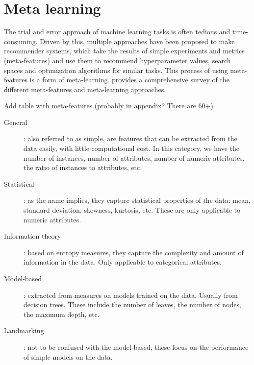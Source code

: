 \section{Meta learning}
\label{sec:meta-learning}

The trial and error approach of machine learning tasks is often tedious and
time-consuming. Driven by this, multiple approaches have been proposed to make
recommender systems, which take the results of simple experiments and metrics
(meta-features) and use them to recommend hyperparameter values, search spaces
and optimization algorithms for similar tasks. This process of using
meta-features is a form of meta-learning. \Textcite{rivolliMetafeaturesMetalearning2022}
provides a comprehensive survey of the different meta-features and meta-learning
approaches.

\begin{important}
    Add table with meta-features (probably in appendix? There are 60+)
\end{important}
\begin{description}
    \item[General]: also referred to as simple, are features that can be
    extracted from the data easily, with little computational cost. In this
    category, we have the number of instances, number of attributes, number
    of numeric attributes, the ratio of instances to attributes, etc.

    \item[Statistical]: as the name implies, they capture statistical properties
    of the data: mean, standard deviation, skewness, kurtosis, etc.
    These are only applicable to numeric attributes.

    \item[Information theory]: based on entropy measures, they capture the
    complexity and amount of information in the data.
    Only applicable to categorical attributes.

    \item[Model-based]: extracted from measures on models trained on the data.
    Usually from decision trees. These include the number of leaves, the
    number of nodes, the maximum depth, etc.

    \item[Landmarking]: not to be confused with the model-based, these focus
    on the performance of simple models on the data.
\end{description}

